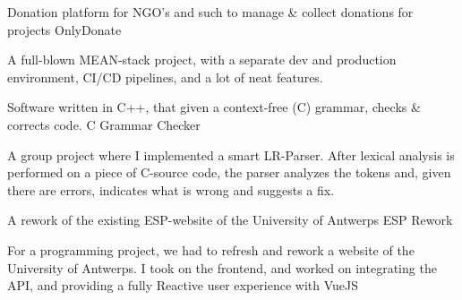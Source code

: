 
\begin{cventries}

    \cventry
    {Donation platform for NGO's and such to manage \& collect donations for projects} %
    {OnlyDonate} %
    {} %
    {} %
    {
    \begin{cvitems} %
        \item {A full-blown MEAN-stack project, with a separate dev and production environment, CI/CD pipelines, and a lot of neat features.}
    \end{cvitems}
    }
    
    \cventry
    {Software written in C++, that given a context-free (C) grammar, checks \& corrects code.} %
    {C Grammar Checker} %
    {} %
    {} %
    {
    \begin{cvitems} %
        \item {A group project where I implemented a smart LR-Parser. After lexical analysis is performed on a piece of C-source code, the parser analyzes the tokens and, given there are errors, indicates what is wrong and suggests a fix. }
    \end{cvitems}
    }
    
    \cventry
    {A rework of the existing ESP-website of the University of Antwerps} %
    {ESP Rework} %
    {} %
    {} %
    {
    \begin{cvitems} %
      	\item {For a programming project, we had to refresh and rework a website of the University of Antwerps. I took on the frontend, and worked on integrating the API, and providing a fully Reactive user experience with VueJS }
    \end{cvitems}
    }
    
\end{cventries}